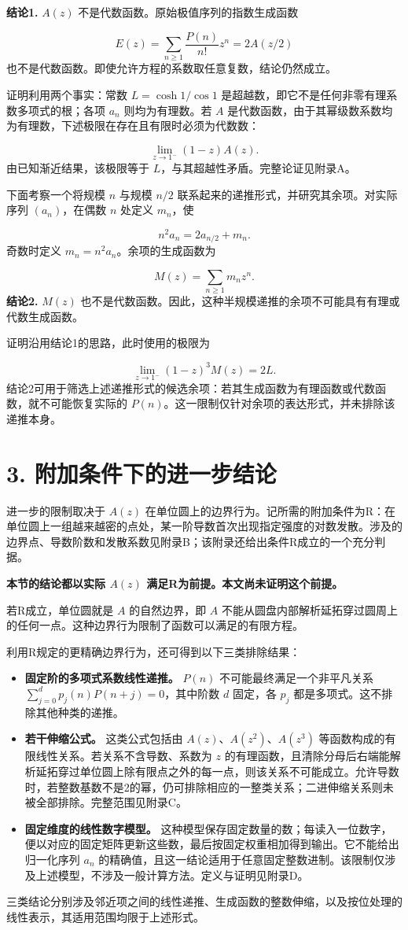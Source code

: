 \documentclass[12pt,a4paper]{article}
\begin{document}
\textbf{结论1.} $A(z)$ 不是代数函数。原始极值序列的指数生成函数

\[
E(z)=\sum_{n\ge1}\frac{P(n)}{n!}z^n=2A(z/2)
\]
也不是代数函数。即使允许方程的系数取任意复数，结论仍然成立。

证明利用两个事实：常数 $L=\cosh1/\cos1$ 是超越数，即它不是任何非零有理系数多项式的根；各项 $a_n$ 则均为有理数。若 $A$ 是代数函数，由于其幂级数系数均为有理数，下述极限在存在且有限时必须为代数数：

\[
\lim_{z\to1^-}(1-z)A(z).
\]
由已知渐近结果，该极限等于 $L$，与其超越性矛盾。完整论证见附录A。

下面考察一个将规模 $n$ 与规模 $n/2$ 联系起来的递推形式，并研究其余项。对实际序列 $(a_n)$，在偶数 $n$ 处定义 $m_n$，使

\[
n^2a_n=2a_{n/2}+m_n.
\]
奇数时定义 $m_n=n^2a_n$。余项的生成函数为

\[
M(z)=\sum_{n\ge1}m_nz^n.
\]
\textbf{结论2.} $M(z)$ 也不是代数函数。因此，这种半规模递推的余项不可能具有有理或代数生成函数。

证明沿用结论1的思路，此时使用的极限为

\[
\lim_{z\to1^-}(1-z)^3M(z)=2L.
\]
结论2可用于筛选上述递推形式的候选余项：若其生成函数为有理函数或代数函数，就不可能恢复实际的 $P(n)$。这一限制仅针对余项的表达形式，并未排除该递推本身。

\section*{3. 附加条件下的进一步结论}
进一步的限制取决于 $A(z)$ 在单位圆上的边界行为。记所需的附加条件为R：在单位圆上一组越来越密的点处，某一阶导数首次出现指定强度的对数发散。涉及的边界点、导数阶数和发散系数见附录B；该附录还给出条件R成立的一个充分判据。

\textbf{本节的结论都以实际 $A(z)$ 满足R为前提。本文尚未证明这个前提。}

若R成立，单位圆就是 $A$ 的自然边界，即 $A$ 不能从圆盘内部解析延拓穿过圆周上的任何一点。这种边界行为限制了函数可以满足的有限方程。

利用R规定的更精确边界行为，还可得到以下三类排除结果：

\begin{itemize}[leftmargin=*]
\item \textbf{固定阶的多项式系数线性递推。} $P(n)$ 不可能最终满足一个非平凡关系 $\sum_{j=0}^{d}p_j(n)P(n+j)=0$，其中阶数 $d$ 固定，各 $p_j$ 都是多项式。这不排除其他种类的递推。
\item \textbf{若干伸缩公式。} 这类公式包括由 $A(z)$、$A(z^2)$、$A(z^3)$ 等函数构成的有限线性关系。若关系不含导数、系数为 $z$ 的有理函数，且清除分母后右端能解析延拓穿过单位圆上除有限点之外的每一点，则该关系不可能成立。允许导数时，若整数基数不是2的幂，仍可排除相应的一整类关系；二进伸缩关系则未被全部排除。完整范围见附录C。
\item \textbf{固定维度的线性数字模型。} 这种模型保存固定数量的数；每读入一位数字，便以对应的固定矩阵更新这些数，最后按固定权重相加得到输出。它不能给出归一化序列 $a_n$ 的精确值，且这一结论适用于任意固定整数进制。该限制仅涉及上述模型，不涉及一般计算方法。定义与证明见附录D。
\end{itemize}
三类结论分别涉及邻近项之间的线性递推、生成函数的整数伸缩，以及按位处理的线性表示，其适用范围均限于上述形式。
\end{document}
